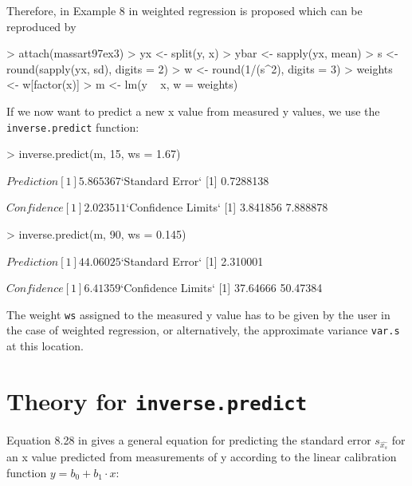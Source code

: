 \documentclass[a4paper]{article}
\begin{document}
Therefore, in Example 8 in \cite{massart97} weighted regression
is proposed which can be reproduced by

\begin{Schunk}
\begin{Sinput}
> attach(massart97ex3)
> yx <- split(y, x)
> ybar <- sapply(yx, mean)
> s <- round(sapply(yx, sd), digits = 2)
> w <- round(1/(s^2), digits = 3)
> weights <- w[factor(x)]
> m <- lm(y ~ x, w = weights)
\end{Sinput}
\end{Schunk}

If we now want to predict a new x value from measured y values,
we use the \texttt{inverse.predict} function:

\begin{Schunk}
\begin{Sinput}
> inverse.predict(m, 15, ws = 1.67)
\end{Sinput}
\begin{Soutput}
$Prediction
[1] 5.865367

$`Standard Error`
[1] 0.7288138

$Confidence
[1] 2.023511

$`Confidence Limits`
[1] 3.841856 7.888878
\end{Soutput}
\begin{Sinput}
> inverse.predict(m, 90, ws = 0.145)
\end{Sinput}
\begin{Soutput}
$Prediction
[1] 44.06025

$`Standard Error`
[1] 2.310001

$Confidence
[1] 6.41359

$`Confidence Limits`
[1] 37.64666 50.47384
\end{Soutput}
\end{Schunk}

The weight \texttt{ws} assigned to the measured y value has to be 
given by the user in the case of weighted regression, or alternatively,
the approximate variance \texttt{var.s} at this location.

\section*{Theory for \texttt{inverse.predict}}
Equation 8.28 in \cite{massart97} gives a general equation for predicting the
standard error $s_{\hat{x_s}}$ for an x value predicted from measurements of y
according to the linear calibration function $ y = b_0 + b_1 \cdot x$:
\end{document}
